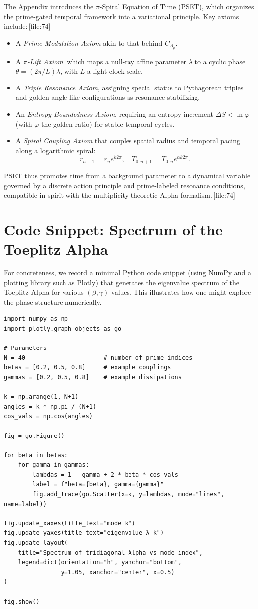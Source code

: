 \documentclass[11pt]{article}
\begin{document}
The Appendix introduces the \(\pi\)-Spiral Equation of Time (PSET), which organizes the prime-gated temporal framework into a variational principle. Key axioms include:\,[file:74]
\begin{itemize}
  \item A \emph{Prime Modulation Axiom} akin to that behind \(C_{\Lambda_p}\).
  \item A \emph{\(\pi\)-Lift Axiom}, which maps a null-ray affine parameter \(\lambda\) to a cyclic phase \(\theta = (2\pi/L)\lambda\), with \(L\) a light-clock scale.
  \item A \emph{Triple Resonance Axiom}, assigning special status to Pythagorean triples and golden-angle-like configurations as resonance-stabilizing.
  \item An \emph{Entropy Boundedness Axiom}, requiring an entropy increment \(\Delta S < \ln \varphi\) (with \(\varphi\) the golden ratio) for stable temporal cycles.
  \item A \emph{Spiral Coupling Axiom} that couples spatial radius and temporal pacing along a logarithmic spiral:
  \[
  r_{n+1} = r_n e^{k 2\pi}, \quad T_{0,n+1} = T_{0,n} e^{\alpha k 2\pi}.
  \]
\end{itemize}

PSET thus promotes time from a background parameter to a dynamical variable governed by a discrete action principle and prime-labeled resonance conditions, compatible in spirit with the multiplicity-theoretic Alpha formalism.\,[file:74]

\section{Code Snippet: Spectrum of the Toeplitz Alpha}

For concreteness, we record a minimal Python code snippet (using NumPy and a plotting library such as Plotly) that generates the eigenvalue spectrum of the Toeplitz Alpha for various \((\beta,\gamma)\) values. This illustrates how one might explore the phase structure numerically.

\begin{verbatim}
import numpy as np
import plotly.graph_objects as go

# Parameters
N = 40                      # number of prime indices
betas = [0.2, 0.5, 0.8]     # example couplings
gammas = [0.2, 0.5, 0.8]    # example dissipations

k = np.arange(1, N+1)
angles = k * np.pi / (N+1)
cos_vals = np.cos(angles)

fig = go.Figure()

for beta in betas:
    for gamma in gammas:
        lambdas = 1 - gamma + 2 * beta * cos_vals
        label = f"beta={beta}, gamma={gamma}"
        fig.add_trace(go.Scatter(x=k, y=lambdas, mode="lines", name=label))

fig.update_xaxes(title_text="mode k")
fig.update_yaxes(title_text="eigenvalue λ_k")
fig.update_layout(
    title="Spectrum of tridiagonal Alpha vs mode index",
    legend=dict(orientation="h", yanchor="bottom",
                y=1.05, xanchor="center", x=0.5)
)

fig.show()
\end{verbatim}
\end{document}
